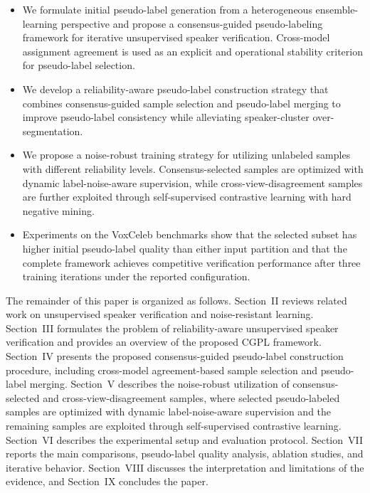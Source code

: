 \documentclass[journal]{IEEEtran}
\begin{document}
\begin{itemize}
    \item We formulate initial pseudo-label generation from a heterogeneous
    ensemble-learning perspective and propose a consensus-guided
    pseudo-labeling framework for iterative unsupervised speaker verification.
    Cross-model assignment agreement is used as an explicit and operational
    stability criterion for pseudo-label selection.

    \item We develop a reliability-aware pseudo-label construction strategy
    that combines consensus-guided sample selection and pseudo-label merging
    to improve pseudo-label consistency while alleviating speaker-cluster
    over-segmentation.

    \item We propose a noise-robust training strategy for utilizing unlabeled
    samples with different reliability levels. Consensus-selected samples are optimized
    with dynamic label-noise-aware supervision, while cross-view-disagreement samples are
    further exploited through self-supervised contrastive learning with hard
    negative mining.

    \item Experiments on the VoxCeleb benchmarks show that the selected
    subset has higher initial pseudo-label quality than either input
    partition and that the complete framework achieves competitive
    verification performance after three training iterations under the
    reported configuration.
\end{itemize}


The remainder of this paper is organized as follows.
Section~II reviews related work on unsupervised speaker verification and noise-resistant learning.
Section~III formulates the problem of reliability-aware unsupervised speaker verification and provides an overview of the proposed CGPL framework.
Section~IV presents the proposed consensus-guided pseudo-label construction procedure, including cross-model agreement-based sample selection and pseudo-label merging.
Section~V describes the noise-robust utilization of consensus-selected and cross-view-disagreement samples, where selected pseudo-labeled samples are optimized with dynamic label-noise-aware supervision and the remaining samples are exploited through self-supervised contrastive learning.
Section~VI describes the experimental setup and evaluation protocol.
Section~VII reports the main comparisons, pseudo-label quality analysis, ablation studies, and iterative behavior.
Section~VIII discusses the interpretation and limitations of the evidence, and Section~IX concludes the paper.
\end{document}
